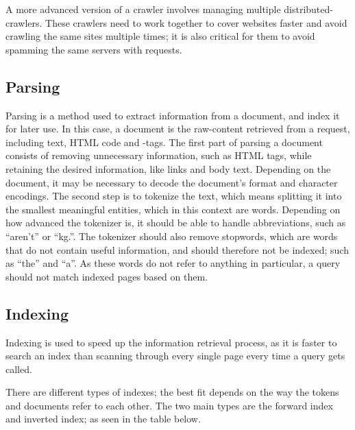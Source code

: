 A more advanced version of a crawler involves managing multiple
distributed-crawlers. These crawlers need to work together to cover websites
faster and avoid crawling the same sites multiple times; it is also critical for
them to avoid spamming the same servers with requests.


\subsection{Parsing} \label{sec:parsing}
Parsing is a method used to extract information from a document, and index it
for later use. In this case, a document is the raw-content retrieved from a
request, including text, HTML code and -tags.
The first part of parsing a document consists of removing unnecessary
information, such as HTML tags, while retaining the desired information, like
links and body text. Depending on the document, it may be necessary to decode
the document's format and character encodings.
The second step is to tokenize the text, which means splitting it into the
smallest meaningful entities, which in this context are words. Depending on how
advanced the tokenizer is, it should be able to handle abbreviations, such as
``aren't'' or ``kg.''. The tokenizer should also remove stopwords, which are
words that do not contain useful information, and should therefore not be
indexed; such as ``the'' and ``a''. As these words do not refer to anything in
particular, a query should not match indexed pages based on them.

\subsection{Indexing}
Indexing is used to speed up the information retrieval process, as it is faster
to search an index than scanning through every single page every time a query
gets called.

There are different types of indexes; the best fit depends on the way the tokens
and documents refer to each other. The two main types are the forward index and
inverted index; as seen in the table below.

